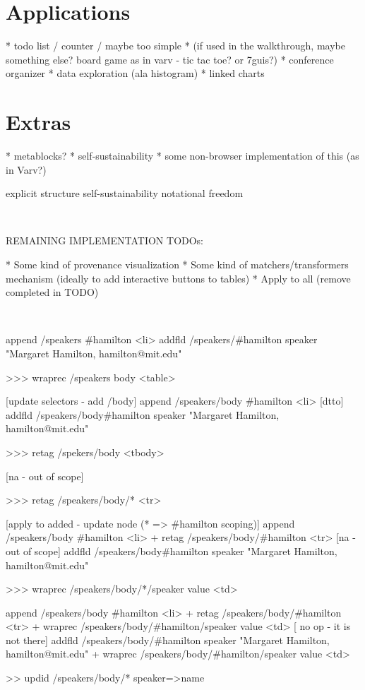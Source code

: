 \documentclass[sigconf,anonymous,screen]{acmart}
\begin{document}
\section{Applications}
* todo list / counter / maybe too simple
* (if used in the walkthrough, maybe something else? board game as in varv - tic tac toe? or 7guis?)
* conference organizer
* data exploration (ala histogram)
* linked charts

\section{Extras}
* metablocks?
* self-sustainability
* some non-browser implementation of this (as in Varv?)

explicit structure
self-sustainability
notational freedom

\newpage
~

REMAINING IMPLEMENTATION TODOs:

* Some kind of provenance visualization
* Some kind of matchers/transformers mechanism (ideally to add interactive buttons to tables)
* Apply to all (remove completed in TODO)

\newpage
~


append /speakers \#hamilton <li>
addfld /speakers/\#hamilton speaker "Margaret Hamilton, hamilton@mit.edu"

>>> wraprec /speakers body <table>

[update selectors - add /body]
append /speakers/body \#hamilton <li>
[dtto]
addfld /speakers/body\#hamilton speaker "Margaret Hamilton, hamilton@mit.edu"

>>> retag /spekers/body <tbody>

[na - out of scope]

>>> retag /speakers/body/* <tr>

[apply to added - update node (* => \#hamilton scoping)]
append /speakers/body \#hamilton <li>
+ retag /speakers/body/\#hamilton <tr>
[na - out of scope]
addfld /speakers/body\#hamilton speaker "Margaret Hamilton, hamilton@mit.edu"

>>> wraprec /speakers/body/*/speaker value <td>

append /speakers/body \#hamilton <li>
+ retag /speakers/body/\#hamilton <tr>
+ wraprec /speakers/body/\#hamilton/speaker value <td> [ no op - it is not there]
addfld /speakers/body/\#hamilton speaker "Margaret Hamilton, hamilton@mit.edu"
+ wraprec /speakers/body/\#hamilton/speaker value <td>

>> updid /speakers/body/* speaker=>name
\end{document}
